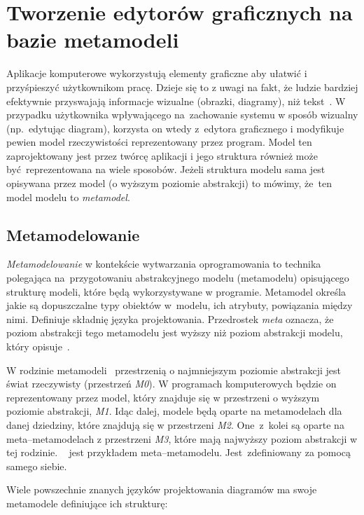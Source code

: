 \chapter{Tworzenie edytorów graficznych na bazie metamodeli}

Aplikacje komputerowe wykorzystują elementy graficzne aby ułatwić i
przyśpieszyć użytkownikom pracę.
Dzieje się to z uwagi na fakt, że ludzie bardziej efektywnie przyswajają
informacje wizualne (obrazki, diagramy), niż
tekst~\cite{images-more-effective-article}.
W przypadku użytkownika
wpływającego na~zachowanie systemu w sposób wizualny (np.\ edytując diagram),
korzysta on wtedy z~edytora graficznego i modyfikuje pewien model
rzeczywistości reprezentowany przez program. Model ten zaprojektowany jest
przez twórcę aplikacji i jego struktura również może być~reprezentowana na
wiele sposobów. Jeżeli struktura modelu sama jest opisywana przez model (o
wyższym poziomie abstrakcji) to mówimy, że~ten model modelu to
\emph{metamodel}.

\section{Metamodelowanie}

\emph{Metamodelowanie} w kontekście wytwarzania oprogramowania to
technika polegająca
na~przygotowaniu abstrakcyjnego modelu (metamodelu) opisującego strukturę
modeli, które będą wykorzystywane w programie. Metamodel określa jakie są
dopuszczalne typy obiektów w~modelu, ich atrybuty, powiązania między nimi.
Definiuje składnię języka projektowania. Przedrostek \emph{meta} oznacza, że
poziom abstrakcji tego metamodelu jest wyższy niż poziom abstrakcji modelu,
który opisuje~\cite{from-requirements-to-java-in-a-snap}.

W rodzinie metamodeli~\cite{introduction-to-metamodels} przestrzenią o
najmniejszym poziomie abstrakcji jest
świat rzeczywisty (przestrzeń \emph{M0}). W programach komputerowych będzie on
reprezentowany przez model, który znajduje się w przestrzeni o wyższym poziomie
abstrakcji, \emph{M1}. Idąc dalej, modele będą oparte na metamodelach dla danej
dziedziny, które znajdują się w przestrzeni \emph{M2}. One~z~kolei są oparte na
meta--metamodelach %
z przestrzeni \emph{M3}, które mają najwyższy poziom
abstrakcji w tej rodzinie. ~\cite{mof-omg-specification} jest
przykładem meta--metamodelu. %
Jest~zdefiniowany za pomocą samego siebie.

Wiele powszechnie znanych języków projektowania diagramów ma swoje metamodele
definiujące ich strukturę:

